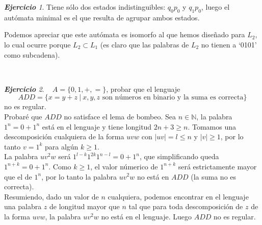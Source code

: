 \documentclass[12pt,spanish]{article}
\theoremstyle{definition}
\theoremstyle{remark}
\newtheorem{exercise}{\textbf{Ejercicio}}%
\begin{document}
\begin{exercise}
  Tiene sólo dos estados indistinguibles: $q_0p_0$ y $q_1p_0$, luego el
  autómata minimal es el que resulta de agrupar ambos estados.

  \begin{figure}[H]
    \centering
  \end{figure}

  Podemos apreciar que este autómata es isomorfo al que hemos diseñado
  para $L_2$, lo cual ocurre porque $L_2 \subset L_1$ (es claro que
  las palabras de $L_2$ no tienen a `0101' como subcadena).
\end{exercise}

~

\setcounter{exercise}{44}

\begin{exercise}~ $A=\{0,1,+,=\}$, probar que el lenguaje
  \[ADD=\{x=y+z \ | \ x,y,z \text{ son números en binario y la suma es correcta}\}\]
  no es regular. \\

  Probaré que $ADD$ no satisface el lema de bombeo. Sea
  $n \in \mathbb{N}$, la palabra $1^n=0+1^n$ está en el lenguaje y
  tiene longitud $2n+3 \geq n$. Tomamos una descomposición cualquiera
  de la forma $uvw$ con $|uv| = l \leq n$ y $|v|\geq 1$, por lo tanto
  $v = 1^k$ para algún $k \geq 1$. \\

  La palabra $uv^2w$ será $1^{l-k}1^{2k}1^{n-l}=0+1^n$, que
  simplificando queda $1^{n+k}=0+1^n$. Como $k \geq 1$, el valor
  númerico de $1^{n+k}$ será estrictamente mayor que el de $1^n$, por
  lo tanto la palabra $uv^2w$ no está en $ADD$ (la suma no es
  correcta). \\

  Resumiendo, dado un valor de $n$ cualquiera, podemos encontrar en el
  lenguaje una palabra $z$ de longitud mayor que $n$ tal que para toda
  descomposición de $z$ de la forma $uvw$, la palabra $uv^2w$ no está
  en el lenguaje. Luego  $ADD$ no es regular.
\end{exercise}
\end{document}
